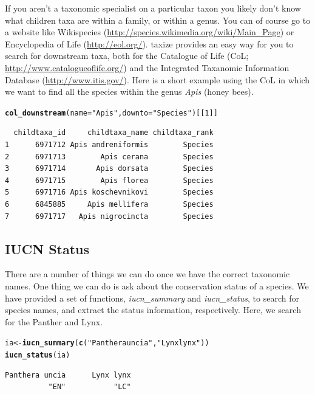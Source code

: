 \documentclass[letterpaper,superscriptaddress,showkeys,longbibliography]{revtex4-1}\usepackage{graphicx, color}
\makeatletter
\newcommand{\hlfunctioncall}[1]{\textcolor[rgb]{0.501960784313725,0,0.329411764705882}{\textbf{#1}}}%
\newcommand{\hlstring}[1]{\textcolor[rgb]{0.6,0.6,1}{#1}}%
\newenvironment{kframe}{%
 \def\at@end@of@kframe{}%
 \ifinner\ifhmode%
  \def\at@end@of@kframe{\end{minipage}}%
  \begin{minipage}{\columnwidth}%
 \fi\fi%
 \def\FrameCommand##1{\hskip\@totalleftmargin \hskip-\fboxsep
 \colorbox{shadecolor}{##1}\hskip-\fboxsep
     \hskip-\linewidth \hskip-\@totalleftmargin \hskip\columnwidth}%
 \MakeFramed {\advance\hsize-\width
   \@totalleftmargin\z@ \linewidth\hsize
   \@setminipage}}%
 {\par\unskip\endMakeFramed%
 \at@end@of@kframe}
\newenvironment{knitrout}{}{} %
\makeatother
\begin{document}
If you aren't a taxonomic specialist on a particular taxon you likely don't know what children taxa are within a family, or within a genus. You can of course go to a website like Wikispecies (\url{http://species.wikimedia.org/wiki/Main_Page}) or Encyclopedia of Life (\url{http://eol.org/}). taxize provides an easy way for you to search for downstream taxa, both for the Catalogue of Life (CoL; \url{http://www.catalogueoflife.org/}) and the Integrated Taxanomic Information Database (\url{http://www.itis.gov/}). Here is a short example using the CoL in which we want to find all the species within the genus \emph{Apis} (honey bees).

\begin{knitrout}
\color{fgcolor}\begin{kframe}
\begin{alltt}
\hlfunctioncall{col_downstream}(name = \hlstring{"Apis"}, downto = \hlstring{"Species"})[[1]]
\end{alltt}
\begin{verbatim}
  childtaxa_id     childtaxa_name childtaxa_rank
1      6971712 Apis andreniformis        Species
2      6971713        Apis cerana        Species
3      6971714       Apis dorsata        Species
4      6971715        Apis florea        Species
5      6971716 Apis koschevnikovi        Species
6      6845885     Apis mellifera        Species
7      6971717   Apis nigrocincta        Species
\end{verbatim}
\end{kframe}
\end{knitrout}


\subsection{IUCN Status}

There are a number of things we can do once we have the correct taxonomic names. One thing we can do is ask about the conservation status of a species. We have provided a set of functions, \emph{iucn\_summary} and \emph{iucn\_status}, to search for species names, and extract the status information, respectively. Here, we search for the Panther and Lynx.  

\begin{knitrout}
\color{fgcolor}\begin{kframe}
\begin{alltt}
ia <- \hlfunctioncall{iucn_summary}(\hlfunctioncall{c}(\hlstring{"Panthera uncia"}, \hlstring{"Lynx lynx"}))
\hlfunctioncall{iucn_status}(ia)
\end{alltt}
\begin{verbatim}
Panthera uncia      Lynx lynx 
          "EN"           "LC" 
\end{verbatim}
\end{kframe}
\end{knitrout}
\end{document}
